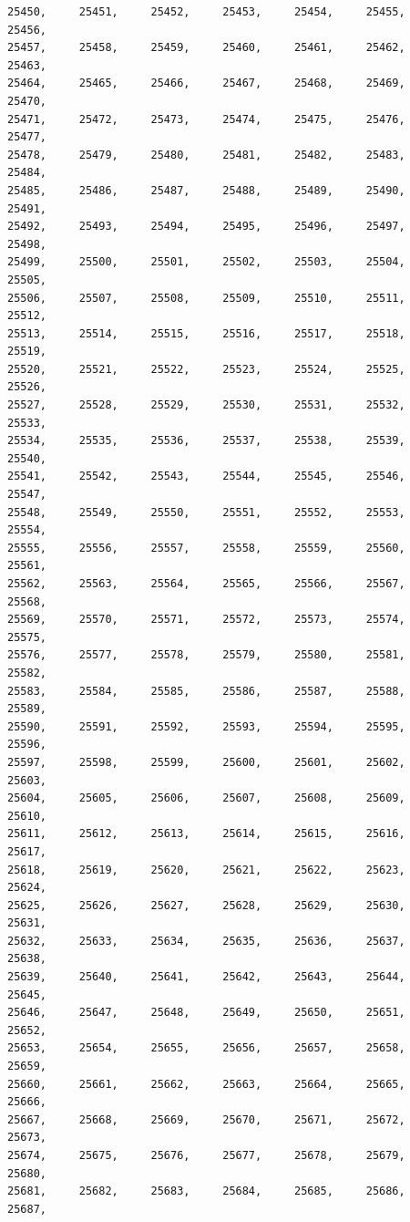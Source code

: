 \documentclass[a4paper,11pt]{report}
\begin{document}
\begin{verbatim}
25450,     25451,     25452,     25453,     25454,     25455,     25456,     
25457,     25458,     25459,     25460,     25461,     25462,     25463,     
25464,     25465,     25466,     25467,     25468,     25469,     25470,     
25471,     25472,     25473,     25474,     25475,     25476,     25477,     
25478,     25479,     25480,     25481,     25482,     25483,     25484,     
25485,     25486,     25487,     25488,     25489,     25490,     25491,     
25492,     25493,     25494,     25495,     25496,     25497,     25498,     
25499,     25500,     25501,     25502,     25503,     25504,     25505,     
25506,     25507,     25508,     25509,     25510,     25511,     25512,     
25513,     25514,     25515,     25516,     25517,     25518,     25519,     
25520,     25521,     25522,     25523,     25524,     25525,     25526,     
25527,     25528,     25529,     25530,     25531,     25532,     25533,     
25534,     25535,     25536,     25537,     25538,     25539,     25540,     
25541,     25542,     25543,     25544,     25545,     25546,     25547,     
25548,     25549,     25550,     25551,     25552,     25553,     25554,     
25555,     25556,     25557,     25558,     25559,     25560,     25561,     
25562,     25563,     25564,     25565,     25566,     25567,     25568,     
25569,     25570,     25571,     25572,     25573,     25574,     25575,     
25576,     25577,     25578,     25579,     25580,     25581,     25582,     
25583,     25584,     25585,     25586,     25587,     25588,     25589,     
25590,     25591,     25592,     25593,     25594,     25595,     25596,     
25597,     25598,     25599,     25600,     25601,     25602,     25603,     
25604,     25605,     25606,     25607,     25608,     25609,     25610,     
25611,     25612,     25613,     25614,     25615,     25616,     25617,     
25618,     25619,     25620,     25621,     25622,     25623,     25624,     
25625,     25626,     25627,     25628,     25629,     25630,     25631,     
25632,     25633,     25634,     25635,     25636,     25637,     25638,     
25639,     25640,     25641,     25642,     25643,     25644,     25645,     
25646,     25647,     25648,     25649,     25650,     25651,     25652,     
25653,     25654,     25655,     25656,     25657,     25658,     25659,     
25660,     25661,     25662,     25663,     25664,     25665,     25666,     
25667,     25668,     25669,     25670,     25671,     25672,     25673,     
25674,     25675,     25676,     25677,     25678,     25679,     25680,     
25681,     25682,     25683,     25684,     25685,     25686,     25687,     

\end{verbatim}
\end{document}

